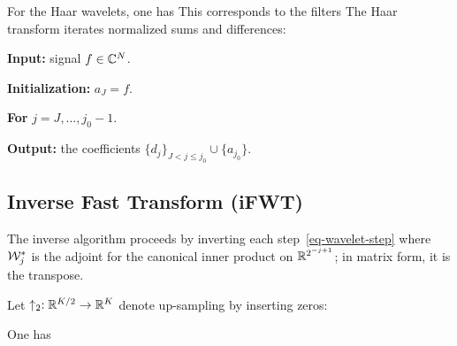 For the Haar wavelets, one has
This corresponds to the filters
The Haar transform iterates normalized sums and differences:
\begin{rs}
	\item \textbf{Input:} signal $f \in \mathbb{C}^N$.
	\item \textbf{Initialization:} $a_J = f$.
	\item \textbf{For} $j=J,\ldots,j_0-1$.
	\item \textbf{Output:} the coefficients $\{d_j\}_{J<j\leq j_0} \cup \{ a_{j_0} \}$.
\end{rs}

\subsection{Inverse Fast Transform (iFWT)}

The inverse algorithm proceeds by inverting each step~\eqref{eq-wavelet-step}
where $\mathcal{W}_j^{*}$ is the adjoint for the canonical inner product on $\mathbb{R}^{2^{-j+1}}$; in matrix form, it is the transpose.

Let $\uparrow_2 : \mathbb{R}^{K/2} \rightarrow \mathbb{R}^K$ denote up-sampling by inserting zeros:

\begin{prop}
One has
\end{prop}

